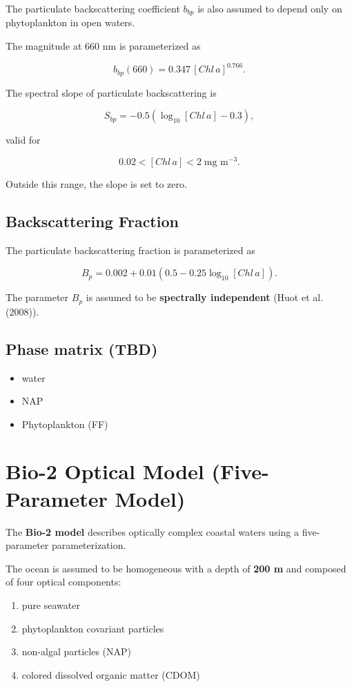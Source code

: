 \documentclass[
  letterpaper,
  open=any]{scrbook}
\providecommand{\tightlist}{%
  \setlength{\itemsep}{0pt}\setlength{\parskip}{0pt}}
\begin{document}
The particulate backscattering coefficient \(b_{bp}\) is also assumed to
depend only on phytoplankton in open waters.

The magnitude at 660 nm is parameterized as

\[
b_{bp}(660) = 0.347\,[Chl\,a]^{0.766}.
\]

The spectral slope of particulate backscattering is

\[
S_{bp} = -0.5\left(\log_{10}[Chl\,a] - 0.3\right),
\]

valid for

\[
0.02 < [Chl\,a] < 2 \; \text{mg m}^{-3}.
\]

Outside this range, the slope is set to zero.

\subsection{Backscattering Fraction}\label{backscattering-fraction}

The particulate backscattering fraction is parameterized as

\[
B_p = 0.002 + 0.01\left(0.5 - 0.25\log_{10}[Chl\,a]\right).
\]

The parameter \(B_p\) is assumed to be \textbf{spectrally independent}
(Huot et al. (2008)).

\subsection{Phase matrix (TBD)}\label{phase-matrix-tbd}

\begin{itemize}
\tightlist
\item
  water
\item
  NAP
\item
  Phytoplankton (FF)
\end{itemize}

\section{Bio-2 Optical Model (Five-Parameter
Model)}\label{bio-2-optical-model-five-parameter-model}

The \textbf{Bio-2 model} describes optically complex coastal waters
using a five-parameter parameterization.

The ocean is assumed to be homogeneous with a depth of \textbf{200 m}
and composed of four optical components:

\begin{enumerate}
\def\labelenumi{\arabic{enumi}.}
\tightlist
\item
  pure seawater
\item
  phytoplankton covariant particles
\item
  non-algal particles (NAP)
\item
  colored dissolved organic matter (CDOM)
\end{enumerate}
\end{document}
